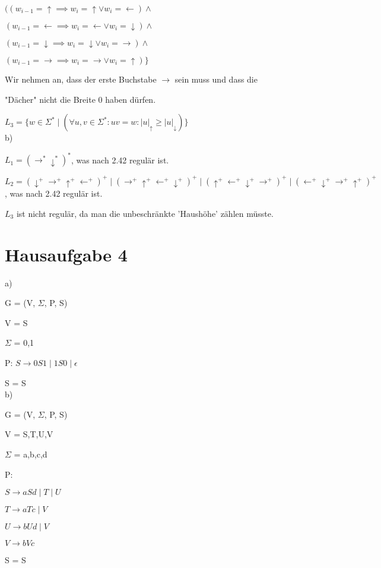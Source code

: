\documentclass{article}
\begin{document}
$((w_{i-1} = \uparrow \implies w_i = \uparrow \lor w_i = \leftarrow) \land$

$(w_{i-1} = \leftarrow \implies w_i = \leftarrow \lor w_i = \downarrow) \land$

$(w_{i-1} = \downarrow \implies w_i = \downarrow \lor w_i = \rightarrow) \land$

$(w_{i-1} = \rightarrow \implies w_i = \rightarrow \lor w_i = \uparrow )\}$

Wir nehmen an, dass der erste Buchstabe $\rightarrow$ sein muss und dass die 

"Dächer" nicht die Breite 0 haben dürfen.

$L_{3} = \{w \in \Sigma^* \mid (\forall u,v \in \Sigma^* :
uv = w : \left| u \right|_\uparrow \geq \left| u \right|_\downarrow) \}$
\\
b)

$L_{1} = (\rightarrow^* \downarrow^*)^* $, was nach 2.42 regulär ist.

$L_{2} = (\downarrow^+\rightarrow^+\uparrow^+\leftarrow^+)^+ 
\mid (\rightarrow^+\uparrow^+\leftarrow^+\downarrow^+)^+
\mid (\uparrow^+\leftarrow^+\downarrow^+\rightarrow^+)^+
\mid (\leftarrow^+\downarrow^+\rightarrow^+\uparrow^+)^+ $, 
was nach 2.42 regulär ist.

$L_{3}$ ist nicht regulär, da man die unbeschränkte 'Haushöhe'
zählen müsste.

\section{Hausaufgabe 4}

a)

G = (V, $\Sigma$, P, S) 

V = {S} 

$\Sigma$ = {0,1} 

P: $S \rightarrow 0S1 \mid 1S0 \mid \epsilon$

S = S 
\\
b)

G = (V, $\Sigma$, P, S) 

V = {S,T,U,V} 

$\Sigma$ = {a,b,c,d} 

P:  

$S \rightarrow aSd \mid T \mid U$

$T \rightarrow aTc \mid V$

$U \rightarrow bUd \mid V$

$V \rightarrow bVc$

S = S 
\end{document}
